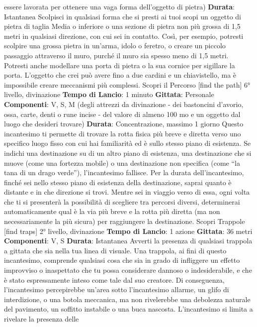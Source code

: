 \begin{multicols}{2}
essere lavorata per ottenere una vaga forma
dell’oggetto di pietra)
\textbf{Durata}: Istantanea
Scolpisci in qualsiasi forma che si presti ai tuoi scopi un
oggetto di pietra di taglia Media o inferiore o una
sezione di pietra non più grossa di 1,5 metri in qualsiasi
direzione, con cui sei in contatto.
Così, per esempio, potresti scolpire una grossa pietra in
un’arma, idolo o feretro, o creare un piccolo passaggio
attraverso il muro, purché il muro sia spesso meno di
1,5 metri. Potresti anche modellare una porta di pietra o
la sua cornice per sigillare la porta. L’oggetto che crei
può avere fino a due cardini e un chiavistello, ma è
impossibile creare meccanismi più complessi.
Scopri il Percorso
[find the path]
6° livello, divinazione
\textbf{Tempo di Lancio}: 1 minuto
\textbf{Gittata}: Personale
\textbf{Componenti}: V, S, M (degli attrezzi da divinazione -
dei bastoncini d’avorio, ossa, carte, denti o rune incise -
del valore di almeno 100 mo e un oggetto dal luogo che
desideri trovare)
\textbf{Durata}: Concentrazione, massimo 1 giorno
Questo incantesimo ti permette di trovare la rotta fisica
più breve e diretta verso uno specifico luogo fisso con
cui hai familiarità ed è sullo stesso piano di esistenza.
Se indichi una destinazione su di un altro piano di
esistenza, una destinazione che si muove (come una 
fortezza mobile) o una destinazione non specifica
(come “la tana di un drago verde”), l’incantesimo
fallisce.
Per la durata dell’incantesimo, finché sei nello stesso
piano di esistenza della destinazione, saprai quanto è
distante e in che direzione si trovi. Mentre sei in viaggio
verso di essa, ogni volta che ti si presenterà la
possibilità di scegliere tra percorsi diversi, determinerai
automaticamente qual è la via più breve e la rotta più
diretta (ma non necessariamente la più sicura) per
raggiungere la destinazione.
Scopri Trappole
[find traps]
2° livello, divinazione
\textbf{Tempo di Lancio}: 1 azione
\textbf{Gittata}: 36 metri
\textbf{Componenti}: V, S
\textbf{Durata}: Istantanea
Avverti la presenza di qualsiasi trappola a gittata che
sia nella tua linea di visuale. Una trappola, ai fini di
questo incantesimo, comprende qualsiasi cosa che sia
in grado di infliggere un effetto improvviso o inaspettato
che tu possa considerare dannoso o indesiderabile, e
che è stato espressamente inteso come tale dal suo
creatore. Di conseguenza, l’incantesimo percepirebbe
un’area sotto l’incantesimo allarme, un glifo di
interdizione, o una botola meccanica, ma non
rivelerebbe una debolezza naturale del pavimento, un
soffitto instabile o una buca nascosta.
L’incantesimo si limita a rivelare la presenza delle

\end{multicols}

